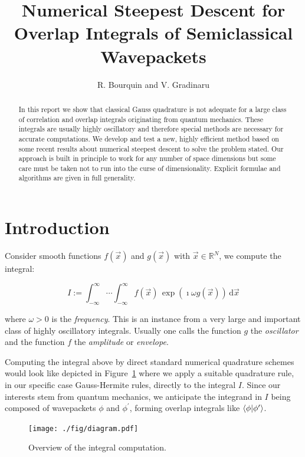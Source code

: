 \documentclass[a4paper,10pt]{article}
\title{Numerical Steepest Descent for Overlap Integrals of Semiclassical Wavepackets}
\author{R. Bourquin and V. Gradinaru}
\begin{document}
\maketitle

\begin{abstract}
  In this report we show that classical Gauss quadrature is not adequate for a large
  class of correlation and overlap integrals originating from quantum mechanics. These
  integrals are usually highly oscillatory and therefore special methods are necessary
  for accurate computations. We develop and test a new, highly efficient method based
  on some recent results about numerical steepest descent to solve the problem stated.
  Our approach is built in principle to work for any number of space dimensions but some
  care must be taken not to run into the curse of dimensionality. Explicit formulae and
  algorithms are given in full generality.
\end{abstract}


\section{Introduction}


Consider smooth functions $f(\vec{x})$ and $g(\vec{x})$ with $\vec{x} \in \mathbb{R}^N$,
we compute the integral:

\begin{equation}\label{eq:hoi}
 I := \int_{-\infty}^{\infty} \cdots \int_{-\infty}^{\infty}
      f(\vec{x}) \, \exp(\imath \omega g(\vec{x}))
      \, \mathrm{d} \vec{x}
\end{equation}

where $\omega > 0$ is the \emph{frequency}.
This is an instance from a very large and important class of highly oscillatory integrals.
Usually one calls the function $g$ the \emph{oscillator} and the function $f$ the
\emph{amplitude} or \emph{envelope}.

Computing the integral above by direct standard numerical quadrature schemes
would look like depicted in Figure~\ref{fig:transformation_chain_1} where we apply a
suitable quadrature rule, in our specific case Gauss-Hermite rules, directly to the
integral $I$. Since our interests stem from quantum mechanics, we anticipate the
integrand in $I$ being composed of wavepackets $\phi$ and
$\phi^\prime$, forming overlap integrals like $\braket{\phi|\phi^\prime}$.

\begin{figure}[h!]
  \centering
  \texttt{[image: ./fig/diagram.pdf]}
  \caption{Overview of the integral computation.}
  \label{fig:transformation_chain_1}
\end{figure}
\end{document}

